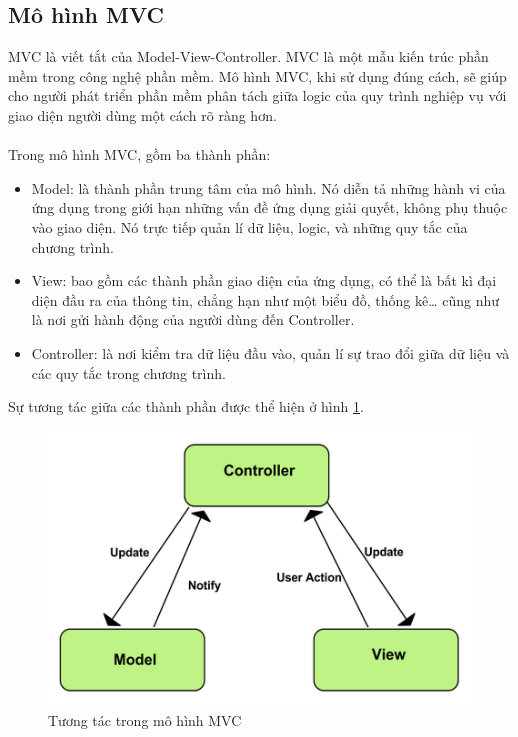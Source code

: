 \documentclass[a4paper]{article}
\begin{document}
\subsection{Mô hình MVC}
MVC là  viết tắt của Model-View-Controller. MVC là một mẫu kiến trúc phần mềm trong công nghệ phần mềm. Mô hình MVC, khi sử dụng đúng cách, sẽ giúp cho người phát triển phần mềm phân tách giữa logic của quy trình nghiệp vụ với giao diện người dùng một cách rõ ràng hơn.\\
\\
Trong mô hình MVC, gồm ba thành phần:
\begin{itemize}
    \item Model: là thành phần trung tâm của mô hình. Nó diễn tả những hành vi của ứng dụng trong giới hạn những vấn đề ứng dụng giải quyết, không phụ thuộc vào giao diện. Nó trực tiếp quản lí dữ liệu, logic, và những quy tắc của chương trình.
    \item View: bao gồm các thành phần giao diện của ứng dụng, có thể là bất kì đại diện đầu ra của thông tin, chẳng hạn như một biểu đồ, thống kê… cũng như là nơi gửi hành động của người dùng đến Controller.
    \item Controller: là nơi kiểm tra dữ liệu đầu vào, quản lí sự trao đổi giữa dữ liệu và các quy tắc trong chương trình.
\end{itemize}
Sự tương tác giữa các thành phần được thể hiện ở hình \ref{fig:mvc}.
\begin{figure}[h]
  \includegraphics[scale=1]{mvc}
  \centering
  \caption{Tương tác trong mô hình MVC}
  \label{fig:mvc}
\end{figure}
\end{document}
